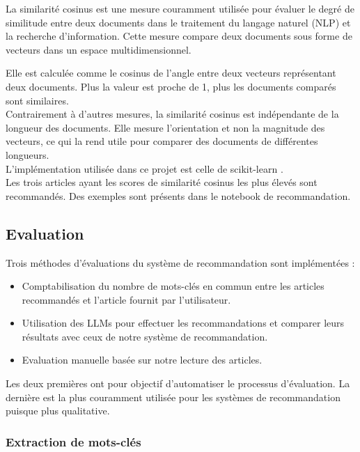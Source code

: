 \documentclass[a4paper,12pt]{article}
\begin{document}
La similarité cosinus est une mesure couramment utilisée pour évaluer le degré de similitude entre deux documents dans le traitement du langage naturel (NLP) et la recherche d'information. Cette mesure compare deux documents sous forme de vecteurs dans un espace multidimensionnel.

Elle est calculée comme le cosinus de l'angle entre deux vecteurs représentant deux documents. Plus la valeur est proche de 1, plus les documents comparés sont similaires.\\

Contrairement à d'autres mesures, la similarité cosinus est indépendante de la longueur des documents. Elle mesure l'orientation et non la magnitude des vecteurs, ce qui la rend utile pour comparer des documents de différentes longueurs.\\

L'implémentation utilisée dans ce projet est celle de scikit-learn \cite{cosine}.\\

Les trois articles ayant les scores de similarité cosinus les plus élevés sont recommandés. Des exemples sont présents dans le notebook de recommandation.


\subsection{Evaluation}

Trois méthodes d'évaluations du système de recommandation sont implémentées : 
\begin{itemize}
    \item Comptabilisation du nombre de mots-clés en commun entre les articles recommandés et l'article fournit par l'utilisateur.
    \item Utilisation des LLMs pour effectuer les recommandations et comparer leurs résultats avec ceux de notre système de recommandation.
    \item Evaluation manuelle basée sur notre lecture des articles.
\end{itemize}

Les deux premières ont pour objectif d'automatiser le processus d'évaluation. La dernière est la plus couramment utilisée pour les systèmes de recommandation puisque plus qualitative. 


\subsubsection{Extraction de mots-clés}
\end{document}
